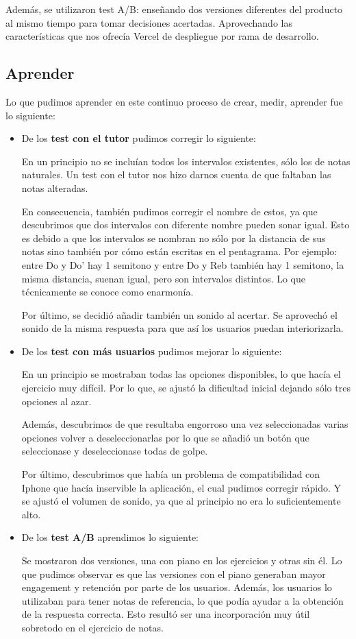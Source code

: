 \documentclass[12pt,twoside,titlepage]{report}
\begin{document}
Además, se utilizaron test A/B: enseñando dos versiones diferentes del producto al mismo tiempo para tomar decisiones acertadas. Aprovechando las características que nos ofrecía Vercel de despliegue por rama de desarrollo.

\subsection{Aprender}

Lo que pudimos aprender en este continuo proceso de crear, medir, aprender fue lo siguiente:

\begin{itemize}

    \item De los \textbf{test con el tutor} pudimos corregir lo siguiente:
    
    En un principio no se incluían todos los intervalos existentes, sólo los de notas naturales. Un test con el tutor nos hizo darnos cuenta de que faltaban las notas alteradas. 
    
    En consecuencia, también pudimos corregir el nombre de estos, ya que descubrimos que dos intervalos con diferente nombre pueden sonar igual. Esto es debido a que los intervalos se nombran no sólo por la distancia de sus notas sino también por cómo están escritas en el pentagrama. Por ejemplo: entre Do y Do' hay 1 semitono y entre Do y Reb también hay 1 semitono, la misma distancia, suenan igual, pero son intervalos distintos. Lo que técnicamente se conoce como enarmonía.
    
    Por último, se decidió añadir también un sonido al acertar. Se aprovechó el sonido de la misma respuesta para que así los usuarios puedan interiorizarla.
    
    \item De los \textbf{test con más usuarios} pudimos mejorar lo siguiente:

    En un principio se mostraban todas las opciones disponibles, lo que hacía el ejercicio muy difícil. Por lo que, se ajustó la dificultad inicial dejando sólo tres opciones al azar. 
    
    Además, descubrimos de que resultaba engorroso una vez seleccionadas varias opciones volver a deseleccionarlas por lo que se añadió un botón que seleccionase y deseleccionase todas de golpe.
    
    Por último, descubrimos que había un problema de compatibilidad con Iphone que hacía inservible la aplicación, el cual pudimos corregir rápido. Y se ajustó el volumen de sonido, ya que al principio no era lo suficientemente alto.
    
    \item De los \textbf{test A/B} aprendimos lo siguiente:
    
    Se mostraron dos versiones, una con piano en los ejercicios y otras sin él. Lo que pudimos observar es que las versiones con el piano generaban mayor engagement y retención por parte de los usuarios. Además, los usuarios lo utilizaban para tener notas de referencia, lo que podía ayudar a la obtención de la respuesta correcta. Esto resultó ser una incorporación muy útil sobretodo en el ejercicio de notas.
\end{itemize}
\end{document}
